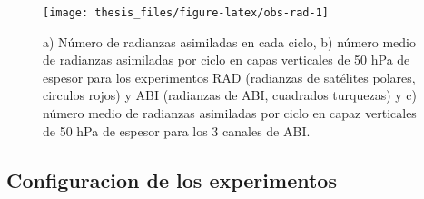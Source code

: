 \documentclass[12pt,oneside,a4paper]{reedthesis}
\begin{document}
\begin{figure}
\texttt{[image: thesis\_files/figure-latex/obs-rad-1]} \caption{a) Número de radianzas asimiladas en cada ciclo, b) número medio de radianzas asimiladas por ciclo en capas verticales de 50 hPa de espesor para los experimentos RAD (radianzas de satélites polares, circulos rojos) y ABI (radianzas de ABI, cuadrados turquezas) y c) número medio de radianzas asimiladas por ciclo en capaz verticales de 50 hPa de espesor para los 3 canales de ABI.}\label{fig:obs-rad}
\end{figure}
\hypertarget{configuracion-de-los-experimentos-1}{%
\subsection{Configuracion de los experimentos}\label{configuracion-de-los-experimentos-1}}
\end{document}
